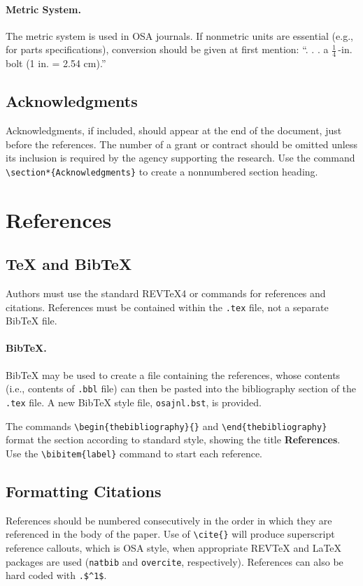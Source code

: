 \documentclass[letterpaper,11pt]{article}   %
\begin{document}
\paragraph*{\bf Metric System.}
The metric system is used in OSA journals. If nonmetric units are
essential (e.g., for parts specifications), conversion should be
given at first mention:  ``. . . a $\frac{1}{4}$\,-in. bolt (1 in.
= 2.54 cm).''


\subsection{Acknowledgments} Acknowledgments, if included, should
appear at the end of the document, just before the references. The
number of a grant or contract should be omitted unless its
inclusion is required by the agency supporting the research. Use
the command \verb+\section*{Acknowledgments}+  to create a
nonnumbered section heading.

\section{References}
\subsection{\TeX{} and Bib\TeX} Authors must use the standard
REV\TeX{}4 or \LaTeXe{} commands for references and citations.
References must be contained within the \texttt{.tex} file, not a
separate Bib\TeX{} file.  

\paragraph{Bib\TeX.} Bib\TeX{} may be used to create a file
containing the references, whose contents (i.e., contents of \texttt{.bbl} file) can then be pasted into the bibliography section of
the \texttt{.tex} file. A new Bib\TeX{} style file, \texttt{osajnl.bst}, is provided.

The commands \verb+\begin{thebibliography}{}+ and
\verb+\end{thebibliography}+ format the section according to
standard style, showing the title {\bf References}.  Use the
\verb+\bibitem{label}+ command to start each reference.

\subsection{Formatting Citations}
References should be numbered consecutively in the order in which
they are referenced in the body of the paper. Use of
\verb+\cite{}+ will produce superscript reference callouts, which
is OSA style, when appropriate REV\TeX{} and \LaTeX{} packages are
used (\texttt{natbib} and \texttt{overcite}, respectively). References
can also be hard coded with \verb+.$^1$+.
\end{document}
